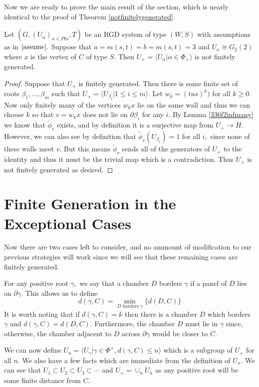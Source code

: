 \documentclass[class=book, crop=false]{standalone}
\begin{document}
Now we are ready to prove the main result of the section, which is nearly identical to the proof of Theorem \ref{notfinitelygenerated}.
\begin{theorem}
	\label{336f2notfg}
	Let $(G,(U_\alpha)_{\alpha\in Phi},T)$ be an RGD system of type $(W,S)$ with assumptions as in $\eqref{assume}.$ Suppose that $a=m(s,t)=b=m(s,t)=3$ and $U_x\cong G_2(2)$ where $x$ is the vertex of $C$ of type $S.$ Then $U_+=\langle U_\alpha|\alpha\in \Phi_+\rangle$ is not finitely generated.
\end{theorem}
\begin{proof}
	Suppose that $U_+$ is finitely generated. Then there is some finite set of roots $\beta_1,\dots,\beta_m$ such that $U_+=\langle U_{\beta_i}|1\le i\le m\rangle.$ Let $w_k=(tus)^k)$ for all $k\ge 0.$ Now only finitely many of the vertices $w_kx$ lie on the same wall and thus we can choose $k$ so that $v=w_kx$ does not lie on $\partial \beta_i$ for any $i.$ By Lemma \ref{336f2infmany} we know that $\tilde{\phi}_v$ exists, and by definition it is a surjective map from $U_+\to H.$ However, we can also see by definition that $\tilde{\phi}_v(U_{\beta_i})=1$ for all $i,$ since none of these walls meet $v.$ But this means $\tilde{\phi}_v$ sends all of the generators of $U_+$ to the identity and thus it must be the trivial map which is a contradiction. Thus $U_+$ is not finitely generated as desired.
\end{proof}

\section{Finite Generation in the Exceptional Cases}
Now there are two cases left to consider, and no ammount of modification to our previous strategies will work since we will see that these remaining cases are finitely generated. 

For any positive root $\gamma,$ we say that a chamber $D$ borders $\gamma$ if a panel of $D$ lies on $\partial \gamma.$ This allows us to define
\[
	d(\gamma,C)=\min_{D\text{ borders }\gamma} \{d(D,C)\}
\]
It is worth noting that if $d(\gamma,C)=k$ then there is a chamber $D$ which borders $\gamma$ and $d(\gamma,C)=d(D,C).$ Furthermore, the chamber $D$ must lie in $\gamma$ since, otherwise, the chamber adjacent to $D$ across $\partial\gamma$ would be closer to $C.$

We can now define $U_n=\langle U_{\gamma}|\gamma\in \Phi^+, d(\gamma,C)\le n\rangle$ which is a subgroup of $U_+$ for all $n.$ We also have a few facts which are immediate from the definition of $U_n.$ We can see that $U_1\subset U_2\subset U_3\subset \cdots$ and $U_+=\cup_{n}U_n$ as any positive root will be some finite distance from $C.$ 
\end{document}
